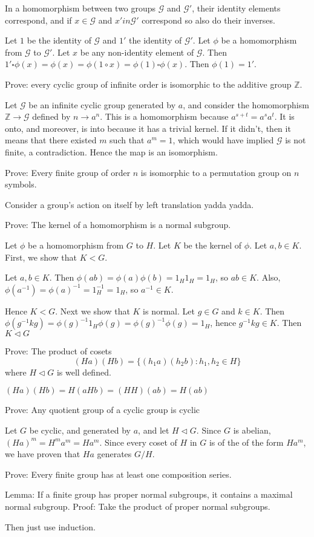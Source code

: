 \exercise
In a homomorphism between two groups $\mathcal{G}$ and $\mathcal{G}'$, their identity elements correspond, and if $x \in \mathcal{G}$ and $x' in \mathcal{G}'$ correspond so also do their inverses.

\answer
Let $1$ be the identity of $\mathcal{G}$ and $1'$ the identity of $\mathcal{G}'$. Let $\phi$ be a homomorphism from $\mathcal{G}$ to $\mathcal{G}'$. Let $x$ be any non-identity element of $\mathcal{G}$. Then $1' \square \phi(x) = \phi(x) = \phi(1 \circ x) = \phi(1) \square \phi(x)$. Then $\phi(1) = 1'$.

\exercise
Prove: every cyclic group of infinite order is isomorphic to the additive group $\mathbb{Z}$.

\answer
Let $\mathcal{G}$ be an infinite cyclic group generated by $a$, and consider the homomorphism $\mathbb{Z} \to \mathcal{G}$ defined by $n \to a^n$. This is a homomorphism because $a^{s+t} = a^s a^t$. It is onto, and moreover, is into because it has a trivial kernel. If it didn't, then it means that there existed $m$ such that $a^m = 1$, which would have implied $\mathcal{G}$ is not finite, a contradiction. Hence the map is an isomorphism.


\exercise
Prove: Every finite group of order $n$ is isomorphic to a permutation group on $n$ symbols.

\answer
Consider a group's action on itself by left translation yadda yadda.


\exercise
Prove: The kernel of a homomorphism is a normal subgroup.

\answer
Let $\phi$ be a homomorphism from $G$ to $H$. Let $K$ be the kernel of $\phi$. Let $a, b \in K$. First, we show that $K < G$.

Let $a, b \in K$. Then $\phi(ab) = \phi(a)\phi(b) = 1_H 1_H = 1_H$, so $ab \in K$. Also, $\phi(a^{-1}) = \phi(a)^{-1} = 1_H^{-1} = 1_H$, so $a^{-1} \in K$. 

Hence $K < G$. Next we show that $K$ is normal. Let $g \in G$ and $k \in K$. Then $\phi(g^{-1}kg) = \phi(g)^{-1} 1_H \phi(g) = \phi(g)^{-1} \phi(g) = 1_H$, hence $g^{-1}kg \in K$. Then $K \triangleleft G$


\exercise
Prove: The product of cosets 
\[(Ha)(Hb) = \{(h_1a)(h_2b): h_1,h_2 \in H\}\]
where $H \triangleleft G$ is well defined.

\answer
$(Ha)(Hb) = H(aHb) = (HH)(ab) = H(ab)$


\exercise
Prove: Any quotient group of a cyclic group is cyclic

\answer
Let $G$ be cyclic, and generated by $a$, and let $H \triangleleft G$. Since $G$ is abelian, $(Ha)^m = H^m a^m = Ha^m$. Since every coset of $H$ in $G$ is of the of the form $Ha^m$, we have proven that $Ha$ generates $G/H$.


\exercise
Prove: Every finite group has at least one composition series.

\answer
Lemma: If a finite group has proper normal subgroups, it contains a maximal normal subgroup. Proof: Take the product of proper normal subgroups.

Then just use induction.

\exercise


\answer


